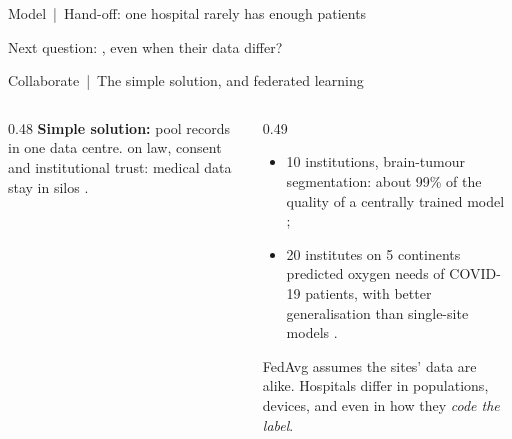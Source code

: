 \documentclass[aspectratio=169,10pt]{beamer}
\begin{document}
\begin{frame}{Model \,|\, Hand-off: one hospital rarely has enough patients}
\centering
{}

\vspace{6mm}
{\footnotesize Next question: , even when their data differ?}
\end{frame}

\begin{frame}{Collaborate \,|\, The simple solution, and federated learning}
\begin{columns}[T]
\begin{column}{0.48\textwidth}
{\footnotesize\textbf{Simple solution:} pool records in one data centre.  on law, consent and institutional trust: medical data stay in silos .}
\vspace{1mm}

\end{column}
\begin{column}{0.49\textwidth}
{\footnotesize{}
\begin{itemize}\setlength\itemsep{2pt}
\item 10 institutions, brain-tumour segmentation: about 99\% of the quality of a centrally trained model ;
\item 20 institutes on 5 continents predicted oxygen needs of COVID-19 patients, with better generalisation than single-site models .
\end{itemize}
\vspace{1mm}
 FedAvg assumes the sites' data are alike. Hospitals differ in populations, devices, and even in how they \emph{code the label}.}
\end{column}
\end{columns}
\end{frame}
\end{document}
